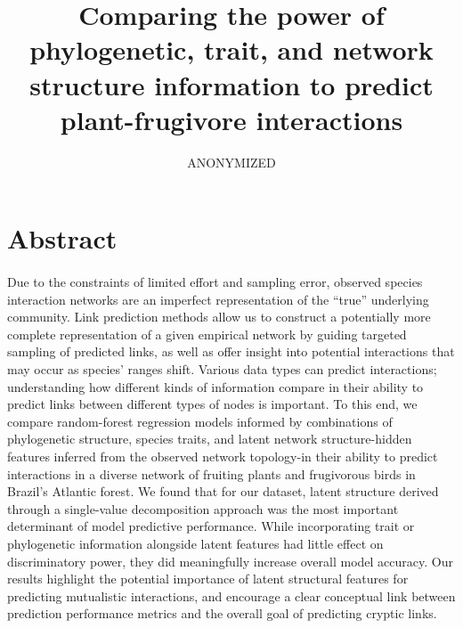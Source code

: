 \documentclass[num-refs]{article}%
\begin{document}
\title{Comparing the power of phylogenetic, trait, and network structure information to predict plant-frugivore interactions}

\author[1\authfn{1}]{ANONYMIZED}

\maketitle

\linenumbers
\section*{Abstract}
\paragraph*{}
Due to the constraints of limited effort and sampling error, observed species interaction networks are an imperfect representation of the ``true'' underlying community. Link prediction methods allow us to construct a potentially more complete representation of a given empirical network by guiding targeted sampling of predicted links, as well as offer insight into potential interactions that may occur as species' ranges shift. Various data types can predict interactions; understanding how different kinds of information compare in their ability to predict links between different types of nodes is important. To this end, we compare random-forest regression models informed by combinations of phylogenetic structure, species traits, and latent network structure-hidden features inferred from the observed network topology-in their ability to predict interactions in a diverse network of fruiting plants and frugivorous birds in Brazil's Atlantic forest. We found that for our dataset, latent structure derived through a single-value decomposition approach was the most important determinant of model predictive performance. While incorporating trait or phylogenetic information alongside latent features had little effect on discriminatory power, they did meaningfully increase overall model accuracy. Our results highlight the potential importance of latent structural features for predicting mutualistic interactions, and encourage a clear conceptual link between prediction performance metrics and the overall goal of predicting cryptic links. \\
\\
\end{document}

